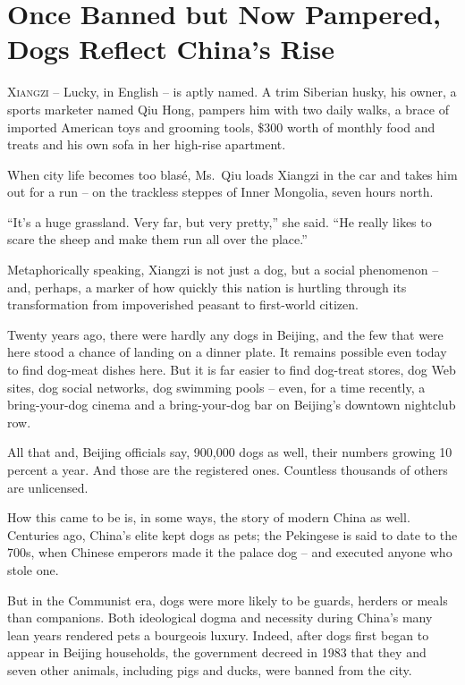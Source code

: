 ﻿\documentclass[12pt]{article}
\begin{document}
\section{Once Banned but Now Pampered, Dogs Reflect China's Rise}

\lettrine{X}{iangzi} -- Lucky, in English -- is aptly named. A trim Siberian
husky, his owner, a sports marketer named Qiu Hong, pampers him with two daily walks, a brace of
imported American toys and grooming tools, \$300 worth of monthly food and treats and his own sofa
in her high-rise apartment.

When city life becomes too blas\'e, Ms.~Qiu loads Xiangzi in the car and takes him out for a run --
on the trackless steppes of Inner Mongolia, seven hours north.

``It's a huge grassland. Very far, but very pretty,'' she said. ``He really likes to scare the sheep
and make them run all over the place.''

Metaphorically speaking, Xiangzi is not just a dog, but a social phenomenon -- and, perhaps, a
marker of how quickly this nation is hurtling through its transformation from impoverished peasant
to first-world citizen.

Twenty years ago, there were hardly any dogs in Beijing, and the few that were here stood a chance
of landing on a dinner plate. It remains possible even today to find dog-meat dishes here. But it is
far easier to find dog-treat stores, dog Web sites, dog social networks, dog swimming pools -- even,
for a time recently, a bring-your-dog cinema and a bring-your-dog bar on Beijing's downtown
nightclub row.

All that and, Beijing officials say, 900,000 dogs as well, their numbers growing 10 percent a year.
And those are the registered ones. Countless thousands of others are unlicensed.

How this came to be is, in some ways, the story of modern China as well. Centuries ago, China's
elite kept dogs as pets; the Pekingese is said to date to the 700s, when Chinese emperors made it
the palace dog -- and executed anyone who stole one.

But in the Communist era, dogs were more likely to be guards, herders or meals than companions. Both
ideological dogma and necessity during China's many lean years rendered pets a bourgeois luxury.
Indeed, after dogs first began to appear in Beijing households, the government decreed in 1983 that
they and seven other animals, including pigs and ducks, were banned from the city.
\end{document}
